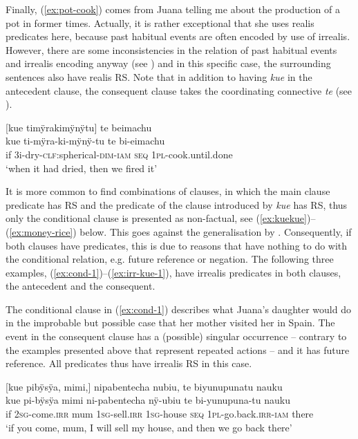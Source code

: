 Finally, (\ref{ex:pot-cook}) comes from Juana telling me about the production of a pot in former times. Actually, it is rather exceptional that she uses realis predicates here, because past habitual events are often encoded by use of irrealis. However, there are some inconsistencies in the relation of past habitual events and irrealis encoding anyway (see ) and in this specific case, the surrounding sentences also have realis RS. Note that in addition to having \textit{kue} in the antecedent clause, the consequent clause takes the coordinating  connective \textit{te} (see ).

\newpage
\ea\label{ex:pot-cook}
\begingl
\glpreamble \textup{[}kue timÿrakimÿnÿtu\textup{]} te beimachu\\
\gla kue ti-mÿra-ki-mÿnÿ-tu te bi-eimachu\\
\glb if 3i-dry-\textsc{clf:}spherical-\textsc{dim}-\textsc{iam} \textsc{seq} 1\textsc{pl}-cook.until.done\\
\glft ‘when it had dried, then we fired it’
\endgl
\trailingcitation{[jxx-d110923l-2.21]}
\xe

It is more common to find combinations of clauses, in which the main clause predicate has  RS and the predicate of the clause introduced by \textit{kue} has  RS, thus only the conditional clause is presented as non-factual, see (\ref{ex:kuekue})–(\ref{ex:money-rice}) below. This goes against the generalisation by \citet[160--161]{Cristofaro2003}. Consequently, if  both clauses have  predicates, this is due to reasons that have nothing to do with the conditional relation, e.g. future reference or negation. The following three examples, (\ref{ex:cond-1})–(\ref{ex:irr-kue-1}), have irrealis predicates in both clauses, the antecedent and the consequent.

The conditional clause in (\ref{ex:cond-1}) describes what Juana’s daughter would do in the improbable but possible case that her mother visited her in Spain. The event in the consequent clause has a (possible) singular occurrence – contrary to the examples presented above that represent repeated actions – and it has future reference. All predicates thus have irrealis RS in this case.

\ea\label{ex:cond-1}
\begingl
\glpreamble \textup{[}kue pibÿsÿa, mimi,\textup{]} nipabentecha nubiu, te biyunupunatu nauku\\
\gla kue pi-bÿsÿa mimi ni-pabentecha nÿ-ubiu te bi-yunupuna-tu nauku\\
\glb if 2\textsc{sg}-come.\textsc{irr} mum 1\textsc{sg}-sell.\textsc{irr} 1\textsc{sg}-house \textsc{seq} 1\textsc{pl}-go.back.\textsc{irr}-\textsc{iam} there\\
\glft ‘if you come, mum, I will sell my house, and then we go back there’
\endgl
\trailingcitation{[jxx-p110923l-1.432]}
\xe

